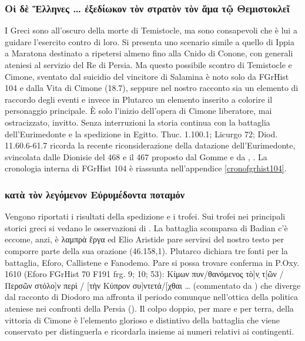{            \subsubsection{\textgreek{Οἱ δὲ Ἕλληνες  …  ἐξεδίωκον τὸν στρατὸν τὸν ἅμα τῷ Θεμιστοκλεῖ}}
            I Greci sono all'oscuro della morte di Temistocle, ma sono consapevoli che è lui a guidare l'esercito contro di loro. Si presenta uno scenario simile a quello di Ippia a Maratona destinato a ripetersi almeno fino alla Cnido di Conone, con generali ateniesi al servizio del Re di Persia. Ma questo possibile scontro di Temistocle e Cimone, sventato dal suicidio del vincitore di Salamina è noto solo da FGrHist 104 e dalla Vita di  Cimone (18.7), seppure nel nostro racconto sia un elemento di raccordo degli eventi e invece in Plutarco un elemento inserito a colorire il personaggio principale. È solo l'inizio dell'opera di  Cimone liberatore, mai ostracizzato, invitto. Senza interruzioni la storia continua con la battaglia dell'Eurimedonte e la spedizione in Egitto. Thuc. 1.100.1; Licurgo  72; Diod. 11.60.6-61.7 \cite[219]{CulassoGastaldi1990} ricorda la recente riconsiderazione della datazione dell'Eurimedonte, svincolata dalle Dionisie del 468 e il 467 proposto dal Gomme e da \cite[75-86]{Meiggs1972}, \cite[125-7]{Green2006}. La cronologia interna di FGrHist 104 è riassunta nell'appendice \ref{cronofgrhist104}.
            \subsubsection{\textgreek{κατὰ τὸν λεγόμενον Εὐρυμέδοντα ποταμόν}}\label{bkm:RefHeading3610319231068}
            Vengono riportati i risultati della spedizione e i trofei. Sui trofei nei principali storici greci si vedano le osservazioni di \cite{Hau2013}. La battaglia scomparsa di Badian c'è eccome, anzi, è  \textgreek{λαμπρὰ ἔργα }ed Elio Aristide pare servirsi del nostro testo per comporre parte della sua orazione (46.158,1). Plutarco dichiara tre fonti per la battaglia, Eforo,  Callistene  e Fanodemo. Pare si possa trovare conferma in P.Oxy. 1610 (Eforo FGrHist 70 F191 frg. 9; 10; 53): \textgreek{Κίμων πυν/θανόμενος τὸ]\d{ν} τ[ῶν / Περσῶν στόλο]ν περὶ / [τὴν Κύπρον συ]ντετά/[χθαι … }(commentato da \cite[406]{Parmeggiani2011}) che diverge dal racconto di  Diodoro ma affronta il periodo comunque nell'ottica della politica ateniese nei confronti della Persia (\cite[399-415]{Parmeggiani2011}). Il colpo doppio, per mare e per terra, della vittoria di  Cimone è l'elemento glorioso e distintivo della battaglia che viene conservato per distinguerla e ricordarla insieme ai numeri relativi ai contingenti. 
}
